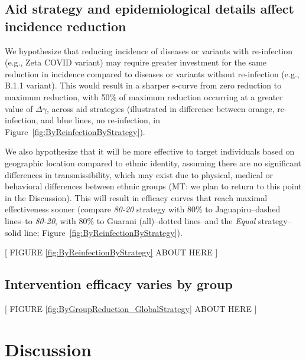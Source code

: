 \documentclass[
  letterpaper,
  abstract]{scrartcl}
\newcommand{\mt}[1]{{\textcolor{myorange} {({\tiny MT:} #1)}}}
\begin{document}
\subsection{Aid strategy and epidemiological details affect incidence reduction}

We hypothesize that reducing incidence of diseases or variants with 
re-infection (e.g., Zeta COVID variant) may require greater investment 
for the same reduction in incidence
compared to diseases or variants without re-infection (e.g., B.1.1 variant).
This would result in a sharper s-curve from zero reduction 
to maximum reduction, with 50\% of maximum reduction occurring 
at a greater value of $\Delta \gamma$, across aid strategies (illustrated in
difference between orange, re-infection, and blue lines, no re-infection, in 
Figure~\ref{fig:ByReinfectionByStrategy}). 

We also hypothesize that it will be more effective to target individuals based on
geographic location compared to ethnic identity, assuming there are no significant
differences in transmissibility, which may exist due to physical, medical or
behavioral differences between ethnic groups \mt{we plan to return to this point in
the Discussion}. This will result in efficacy curves that reach maximal
effectiveness sooner (compare \emph{80-20} strategy with 
80\% to Jaguapiru–dashed lines–to \emph{80-20}, with 80\% to Guarani (all)–dotted
lines–and the \emph{Equal} strategy–solid line;
Figure~\ref{fig:ByReinfectionByStrategy}).

\vspace{0.5em}
\begin{center}
{[ FIGURE \ref{fig:ByReinfectionByStrategy} ABOUT HERE ]} \\
\end{center}



\subsection{Intervention efficacy varies by group}

\vspace{0.5em}
\begin{center}
{[ FIGURE \ref{fig:ByGroupReduction_GlobalStrategy} ABOUT HERE ]} \\
\end{center}


\section{Discussion}\label{discussion}
\end{document}
